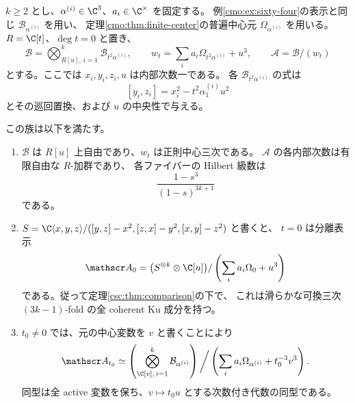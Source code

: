 \begin{proposition}[混合係数の収縮と中心係数の三乗被覆]
\label{cmo:prop:contraction}
$k\geq2$ とし、$\alpha^{(i)}\in\C^3$、$a_i\in\C^\times$ を固定する。
例\ref{cmo:ex:sixty-four}の表示と同じ
$\mathcal B_{\alpha^{(i)}}$ を用い、
定理\ref{cmo:thm:finite-center}の普遍中心元
$\Omega_{\alpha^{(i)}}$ を用いる。
$R=\C[t]$、$\deg t=0$ と置き、
\[
 \mathscr B=
   \bigotimes_{R[u],\,i=1}^{k}\mathcal B_{t^2\alpha^{(i)}},
 \qquad
 w_t=\sum_i a_i\Omega_{t^2\alpha^{(i)}}+u^3,
 \qquad \mathscr A=\mathscr B/(w_t)
\]
とする。ここでは $x_i,y_i,z_i,u$ は内部次数一である。
各 $\mathcal B_{t^2\alpha^{(i)}}$ の式は
\[
 [y_i,z_i]=x_i^2-t^2\alpha^{(i)}_1u^2
\]
とその巡回置換、および $u$ の中央性で与える。

この族は以下を満たす。
\begin{enumerate}[label=(\arabic*)]
\item $\mathscr B$ は $R[u]$ 上自由であり、$w_t$ は正則中心三次である。
      $\mathscr A$ の各内部次数は有限自由な $R$-加群であり、
      各ファイバーの Hilbert 級数は
      \[
        \frac{1-s^3}{(1-s)^{3k+1}}
      \]
      である。
\item $S=\C\langle x,y,z\rangle/
      ([y,z]-x^2,[z,x]-y^2,[x,y]-z^2)$ と書くと、
      $t=0$ は分離表示
      \[
       \mathscr A_0=
       \bigl(S^{\otimes k}\otimes\C[u]\bigr)/
          \left(\sum_i a_i\Omega_0+u^3\right)
      \]
      である。従って定理\ref{csc:thm:comparison}の下で、
      これは滑らかな可換三次 $(3k-1)$-fold の全 coherent Ku 成分を持つ。
\item $t_0\ne0$ では、元の中心変数を $v$ と書くことにより
      \begin{equation}\label{cmo:eq:contraction-isomorphism}
       \mathscr A_{t_0}\simeq
       \left(\bigotimes_{\C[v],\,i=1}^{k}
                           \mathcal B_{\alpha^{(i)}}\right)
       \bigg/\left(\sum_i a_i\Omega_{\alpha^{(i)}}+t_0^{-3}v^3\right).
      \end{equation}
      同型は全 active 変数を保ち、$v\mapsto t_0u$ とする次数付き代数の同型である。
\end{enumerate}
\end{proposition}

